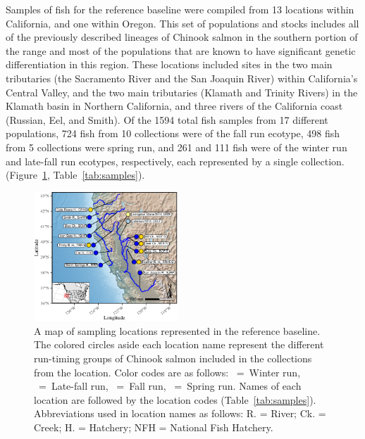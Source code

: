 Samples of fish for the reference baseline were compiled from 13 locations within California, and one
within Oregon. This set of populations and stocks includes all of the previously described lineages of Chinook salmon in the southern portion of the range and most of the populations that are known to have significant genetic differentiation in this region.
These locations included sites in the two
main tributaries (the Sacramento River and the San Joaquin River) within
California's Central Valley, and the two main tributaries (Klamath and Trinity Rivers) in the Klamath basin in Northern California, and
three rivers of the California coast (Russian, Eel, and Smith).
Of the 1594 total fish samples from 17 different populations, 724 fish from 10 collections were of the fall run ecotype,
498 fish from 5 collections were spring run, and 261 and 111 fish were of the winter run and late-fall run ecotypes, 
respectively,  each represented by a single collection.
(Figure~\ref{fig:map}, Table~\ref{tab:samples}).
\begin{figure}
\newcommand{\mapcap}{\footnotesize  A map of sampling locations represented in the reference
baseline.  The colored circles aside
each location name represent the different run-timing groups of Chinook salmon
included in the collections from the location.  Color codes are as follows: \Wball~=~Winter run,
\LFball{}~=~Late-fall run, \Fball~=~Fall run, \Sball~=~Spring run.
Names of each location are followed by the location codes (Table~\ref{tab:samples}).
Abbreviations used in location names as follows:
R. = River; Ck. = Creek; H. = Hatchery; NFH = National Fish Hatchery.}
\begin{center}
\includegraphics[width=0.48\textwidth]{images/map-crop.pdf}
\end{center}
\caption[\mapcap]{\mapcap}
\label{fig:map}
\end{figure}

